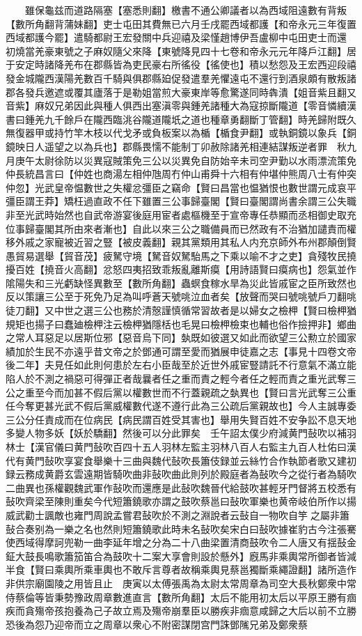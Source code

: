 　　雖保龜兹而道路隔塞【塞悉則翻】檄書不通公卿議者以為西域阻遠數有背叛【數所角翻背蒲妹翻】吏士屯田其費無已六月壬戌罷西域都護【和帝永元三年復置西域都護今罷】遣騎都尉王宏發關中兵迎禧及梁慬趙博伊吾盧柳中屯田吏士而還　初燒當羌豪東號之子麻奴隨父來降【東號降見四十七卷和帝永元元年降戶江翻】居于安定時諸降羌布在郡縣皆為吏民豪右所徭役【徭使也】積以愁怨及王宏西迎段禧發金城隴西漢陽羌數百千騎與俱郡縣廹促發遣羣羌懼遠屯不還行到酒泉頗有散叛諸郡各發兵邀遮或覆其廬落于是勒姐當煎大豪東岸等愈驚遂同時犇潰【姐音紫且翻又音紫】麻奴兄弟因此與種人俱西出塞滇零與鍾羌諸種大為寇掠斷隴道【零音憐續漢書曰鍾羌九千餘戶在隴西臨洮谷隴道隴坁之道也種章勇翻斷丁管翻】時羌歸附既久無復器甲或持竹竿木枝以代戈矛或負板案以為楯【楯食尹翻】或執銅鏡以象兵【銅鏡映日人遥望之以為兵也】郡縣畏懦不能制丁卯赦除諸羌相連結謀叛逆者罪　秋九月庚午太尉徐防以災異寇賊策免三公以災異免自防始辛未司空尹勤以水雨漂流策免　仲長統昌言曰【仲姓也商湯左相仲虺周冇仲山甫舜十六相有仲堪仲熊周八士有仲突仲忽】光武皇帝愠數世之失權忿彊臣之竊命【賢曰昌當也愠猶恨也數世謂元成哀平彊臣謂王莽】矯枉過直政不任下雖置三公事歸臺閣【賢曰臺閣謂尚書余謂三公失職非至光武時始然也自武帝游宴後庭用宦者處樞機至于宣帝專任恭顯而丞相御史取充位事歸臺閣其所由來者漸也】自此以來三公之職備員而已然政有不治猶加譴責而權移外戚之家寵被近習之豎【被皮義翻】親其黨類用其私人内充京師外布州郡顛倒賢愚貿易選舉【貿音茂】疲駑守境【駑音奴駑駘馬之下乘以喻不才之吏】貪殘牧民撓擾百姓【撓音火高翻】忿怒四夷招致乖叛亂離斯瘼【用詩語賢曰瘼病也】怨氣並作隂陽失和三光虧缺怪異數至【數所角翻】蟲螟食稼水旱為災此皆戚宦之臣所致然也反以策讓三公至于死免乃足為叫呼蒼天號咷泣血者矣【放聲而哭曰號咷號戶刀翻咷徒刀翻】又中世之選三公也務於清慤謹慎循常習故者是以婦女之檢柙【賢曰檢柙猶規矩也揚子曰蠢廸檢柙注云檢柙猶隱栝也毛晃曰檢柙檢束也輔也俗作撿押非】鄉曲之常人耳惡足以居斯位邪【惡音烏下同】埶既如彼選又如此而欲望三公勲立於國家績加於生民不亦遠乎昔文帝之於鄧通可謂至愛而猶展申徒嘉之志【事見十四卷文帝後二年】夫見任如此則何患於左右小臣哉至於近世外戚宦豎請託不行意氣不滿立能陷人於不測之禍惡可得彈正者哉曩者任之重而責之輕今者任之輕而責之重光武奪三公之重至今而加甚不假后黨以權數世而不行蓋親疏之埶異也【賢曰言光武奪三公重任今奪更甚光武不假后黨威權數代遂不遵行此為三公疏后黨親故也】今人主誠專委三公分任責成而在位病民【病民謂百姓受其害也】舉用失賢百姓不安争訟不息天地多變人物多妖【妖於驕翻】然後可以分此罪矣　壬午詔太僕少府減黄門鼔吹以補羽林士【漢官儀曰黄門鼔吹百四十五人羽林左監主羽林八百人右監主九百人杜佑曰漢代有黄門鼔吹享宴食舉樂十三曲與魏代鼔吹長簫伎録並云絲竹合作執節者歌又建初録云務成黄爵玄雲遠期皆騎吹曲非鼔吹曲此則列於殿庭者為鼔吹今之從行者為騎吹二曲異也孫權觀魏武軍作鼔吹而還應是此鼔吹魏晉代給鼓吹甚輕牙門督將五校悉有鼔吹齊梁至陳則重矣今代短簫鐃歌亦謂之鼓吹蔡邕曰鼔吹軍樂也黄帝岐伯所作以揚威武勸士諷敵也雍門周說孟嘗君鼔吹於不測之淵說者云鼔自一物吹自竽之屬非簫鼔合奏别為一樂之名也然則短簫鐃歌此時未名鼔吹矣宋白曰鼔吹據崔豹古今注張騫使西域得摩訶兜勒一曲李延年增之分為二十八曲梁置清商鼓吹令二人唐又有揺鼔金鉦大鼓長鳴歌簫笳笛合為鼓吹十二案大享會則設於懸外】廐馬非乘輿常所御者皆減半食【賢曰乘輿所乘車輿也不敢斥言尊者故稱乘輿見蔡邕獨斷乘繩證翻】諸所造作非供宗廟園陵之用皆且止　庚寅以太傅張禹為太尉太常周章為司空大長秋鄭衆中常侍蔡倫等皆秉勢豫政周章數進直言【數所角翻】太后不能用初太后以平原王勝有痼疾而貪殤帝孩抱養為己子故立焉及殤帝崩羣臣以勝疾非痼意咸歸之大后以前不立勝恐後為怨乃迎帝而立之周章以衆心不附密謀閉宫門誅鄧隲兄弟及鄭衆蔡